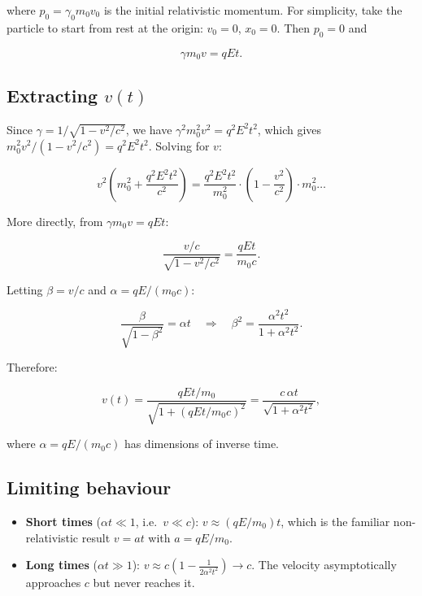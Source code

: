 where $p_0 = \gamma_0 m_0 v_0$ is the initial relativistic momentum. For simplicity, take the particle to start from rest at the origin: $v_0 = 0$, $x_0 = 0$. Then $p_0 = 0$ and

\begin{equation}
\gamma m_0 v = qEt.
\end{equation}

\subsection{Extracting $v(t)$}

Since $\gamma = 1/\sqrt{1 - v^2/c^2}$, we have $\gamma^2 m_0^2 v^2 = q^2E^2t^2$, which gives $m_0^2 v^2/(1-v^2/c^2) = q^2E^2t^2$. Solving for $v$:

\begin{equation}
v^2\!\left(m_0^2 + \frac{q^2E^2t^2}{c^2}\right) = \frac{q^2E^2t^2}{m_0^2}\cdot\!\left(1 - \frac{v^2}{c^2}\right)\cdot m_0^2\ldots
\end{equation}

More directly, from $\gamma m_0 v = qEt$:

\begin{equation}
\frac{v/c}{\sqrt{1 - v^2/c^2}} = \frac{qEt}{m_0 c}.
\end{equation}

Letting $\beta = v/c$ and $\alpha = qE/(m_0 c)$:

\begin{equation}
\frac{\beta}{\sqrt{1-\beta^2}} = \alpha t \quad \Longrightarrow \quad \beta^2 = \frac{\alpha^2 t^2}{1 + \alpha^2 t^2}.
\end{equation}

Therefore:

\begin{equation}
\boxed{v(t) = \frac{qEt/m_0}{\sqrt{1 + (qEt/m_0 c)^2}} = \frac{c\,\alpha t}{\sqrt{1 + \alpha^2 t^2}},}
\end{equation}

where $\alpha = qE/(m_0 c)$ has dimensions of inverse time.

\subsection{Limiting behaviour}

\begin{itemize}
\item \textbf{Short times} ($\alpha t \ll 1$, i.e.\ $v \ll c$): $v \approx (qE/m_0)t$, which is the familiar non-relativistic result $v = at$ with $a = qE/m_0$.
\item \textbf{Long times} ($\alpha t \gg 1$): $v \approx c\!\left(1 - \frac{1}{2\alpha^2 t^2}\right) \to c$. The velocity asymptotically approaches $c$ but never reaches it.
\end{itemize}

